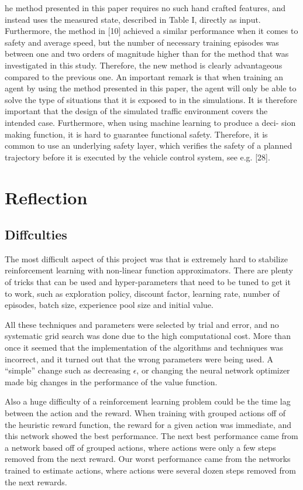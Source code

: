 he method presented in this paper requires no such hand crafted features, and instead uses the measured state, described in Table I, directly as input. Furthermore, the method in [10] achieved a similar performance when it comes to safety and average speed, but the number of necessary training episodes was between one and two orders of magnitude higher than for the method that was investigated in this study. Therefore, the new method is clearly advantageous compared to the previous one.
An important remark is that when training an agent by using the method presented in this paper, the agent will only be able to solve the type of situations that it is exposed to in the simulations. It is therefore important that the design of the simulated traffic environment covers the intended case. Furthermore, when using machine learning to produce a deci- sion making function, it is hard to guarantee functional safety. Therefore, it is common to use an underlying safety layer, which verifies the safety of a planned trajectory before it is executed by the vehicle control system, see e.g. [28].

\section{Reflection}

\subsection{Diffculties}

The most difficult aspect of this project was that is extremely hard to stabilize reinforcement learning with non-linear function approximators. There are plenty of tricks that can be used and hyper-parameters that need to be tuned to get it to work, such as exploration policy, discount factor, learning rate, number of episodes, batch size, experience pool size and initial value.

All these techniques and parameters were selected by trial and error, and no systematic grid search was done due to the high computational cost. More than once it seemed that the implementation of the algorithms and techniques was incorrect, and it turned out that the wrong parameters were being used. A ``simple'' change such as decreasing $\epsilon$, or changing the neural network optimizer made big changes in the performance of the value function.

Also a huge difficulty of a reinforcement learning problem could be the time lag between the action and the reward. When training with grouped actions off of the heuristic reward function, the reward for a given action was immediate, and this network showed the best performance. The next best performance came from a network based off of grouped actions, where actions were only a few steps removed from the next reward. Our worst performance came from the networks trained to estimate actions, where actions were several dozen steps removed from the next rewards.

